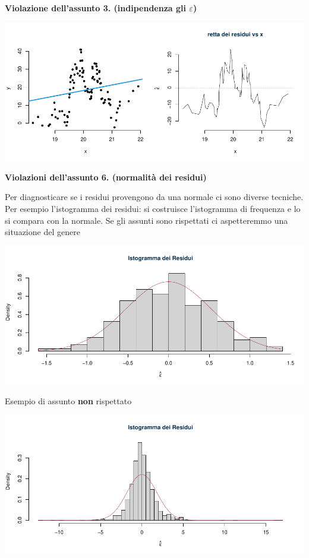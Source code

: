 \documentclass[
  11pt,
]{book}
\theoremstyle{mytheoremstyle}
\theoremstyle{mydefstyle}
\begin{document}
\textbf{Violazione dell'assunto 3. (indipendenza gli \(\varepsilon\))}

\begin{center}\includegraphics{Appunti_di_Statistica_2025_files/figure-latex/18-regressione-II-19-1} \end{center}

\textbf{Violazioni dell'assunto 6. (normalità dei residui)}

Per diagnosticare se i residui provengono da una normale ci sono diverse tecniche.
Per esempio l'istogramma dei residui: si costruisce l'istogramma di frequenza e lo si compara con la normale.
Se gli assunti sono rispettati ci aspetteremmo una situazione del genere

\begin{center}\includegraphics{Appunti_di_Statistica_2025_files/figure-latex/18-regressione-II-21-1} \end{center}

Esempio di assunto \textbf{non} rispettato

\begin{center}\includegraphics{Appunti_di_Statistica_2025_files/figure-latex/18-regressione-II-22-1} \end{center}
\end{document}
